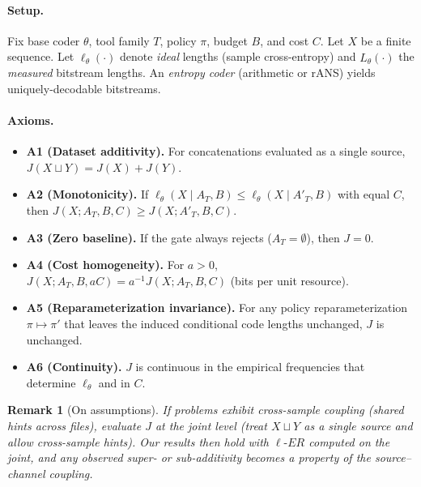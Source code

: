 \documentclass[12pt,a4paper]{article}
\newtheorem{remark}{Remark}
\newcommand{\ERideal}{\ell\text{-}ER}
\begin{document}
\paragraph{Setup.}
Fix base coder $\theta$, tool family $T$, policy $\pi$, budget $B$, and cost $C$. Let $X$ be a finite sequence. Let $\ell_\theta(\cdot)$ denote \emph{ideal} lengths (sample cross-entropy) and $\widehat{L}_\theta(\cdot)$ the \emph{measured} bitstream lengths. An \emph{entropy coder} (arithmetic or rANS) yields uniquely-decodable bitstreams.

\paragraph{Axioms.}
\begin{itemize}
\item \textbf{A1 (Dataset additivity).} For concatenations evaluated as a single source, $J(X\!\sqcup\!Y)=J(X)+J(Y)$.
\item \textbf{A2 (Monotonicity).} If $\ell_\theta(X\mid A_T,B)\le \ell_\theta(X\mid A'_T,B)$ with equal $C$, then $J(X;A_T,B,C)\ge J(X;A'_T,B,C)$.
\item \textbf{A3 (Zero baseline).} If the gate always rejects ($A_T=\emptyset$), then $J=0$.
\item \textbf{A4 (Cost homogeneity).} For $a>0$, $J(X;A_T,B,aC)=a^{-1}J(X;A_T,B,C)$ (bits per unit resource).
\item \textbf{A5 (Reparameterization invariance).} For any policy reparameterization $\pi\mapsto\pi'$ that leaves the induced conditional code lengths unchanged, $J$ is unchanged.
\item \textbf{A6 (Continuity).} $J$ is continuous in the empirical frequencies that determine $\ell_\theta$ and in $C$.
\end{itemize}

\begin{remark}[On assumptions]
If problems exhibit cross-sample coupling (shared hints across files), evaluate $J$ at the \emph{joint} level (treat $X\!\sqcup\!Y$ as a single source and allow cross-sample hints). Our results then hold with $\ERideal$ computed on the joint, and any observed super- or sub-additivity becomes a property of the source--channel coupling.
\end{remark}
\end{document}
